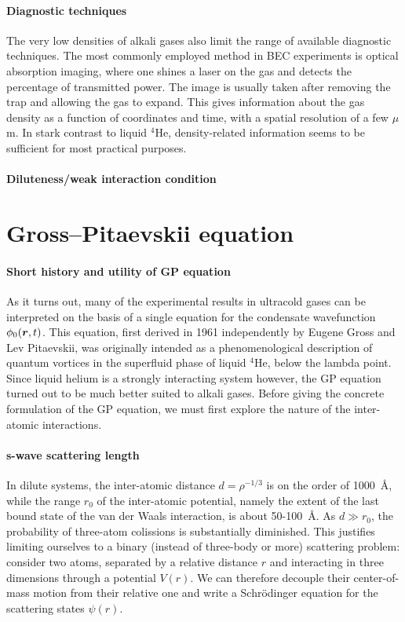 \paragraph{Diagnostic techniques}
The very low densities of alkali gases also limit the range of
available diagnostic techniques. The most commonly employed method in
BEC experiments is optical absorption imaging, where one shines a
laser on the gas and detects the percentage of transmitted power. The
image is usually taken after removing the trap and allowing the gas to
expand. This gives information about the gas density as a function of
coordinates and time, with a spatial resolution of a few $\mu$m. In
stark contrast to liquid ${}^4$He, density-related information seems
to be sufficient for most practical purposes.

\paragraph{Diluteness/weak interaction condition}


\section{Gross–Pitaevskii equation}
\label{sec:GPE}

\paragraph{Short history and utility of GP equation}
As it turns out, many of the experimental results in ultracold gases
can be interpreted on the basis of a single equation for the
condensate wavefunction $\phi_0(\bm{r},t)$. This equation, first derived
in 1961 independently by Eugene Gross and Lev Pitaevskii, was
originally intended as a phenomenological description of quantum
vortices in the superfluid phase of liquid ${}^4$He, below the lambda
point. Since liquid helium is a strongly interacting system however,
the GP equation turned out to be much better suited to alkali gases.
Before giving the concrete formulation of the GP equation, we must
first explore the nature of the inter-atomic interactions.

\paragraph{s-wave scattering length}
In dilute systems, the inter-atomic distance $d = \rho^{-1/3}$ is on
the order of 1000~\AA, while the range $r_0$ of the inter-atomic
potential, namely the extent of the last bound state of the van der
Waals interaction, is about 50-100~\AA. As $d \gg r_0$, the
probability of three-atom colissions is substantially diminished. This
justifies limiting ourselves to a binary (instead of three-body or
more) scattering problem: consider two atoms, separated by a relative
distance $r$ and interacting in three dimensions through a potential
$V(r)$. We can therefore decouple their center-of-mass motion from
their relative one and write a Schr\"{o}dinger equation for the
scattering states $\psi(r)$.

